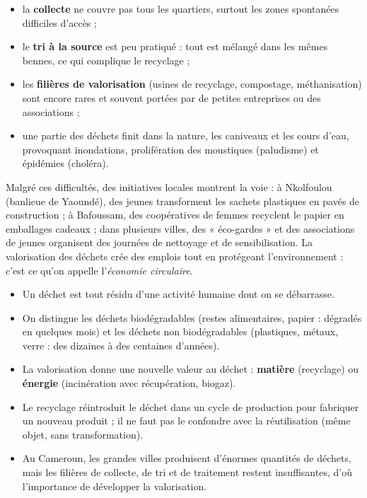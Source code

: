\documentclass[11pt]{article}
\newcommand{\cle}[1]{{\popxbold\color{popdark}#1}}
\begin{document}
\begin{itemize}
\item la \textbf{collecte} ne couvre pas tous les quartiers, surtout les zones spontanées difficiles d'accès ;
\item le \textbf{tri à la source} est peu pratiqué : tout est mélangé dans les mêmes bennes, ce qui complique le recyclage ;
\item les \textbf{filières de valorisation} (usines de recyclage, compostage, méthanisation) sont encore rares et souvent portées par de petites entreprises ou des associations ;
\item une partie des déchets finit dans la nature, les caniveaux et les cours d'eau, provoquant inondations, prolifération des moustiques (paludisme) et épidémies (choléra).
\end{itemize}

\begin{savaistu}
Malgré ces difficultés, des initiatives locales montrent la voie : à Nkolfoulou (banlieue de Yaoundé), des jeunes transforment les sachets plastiques en pavés de construction ; à Bafoussam, des coopératives de femmes recyclent le papier en emballages cadeaux ; dans plusieurs villes, des « éco-gardes » et des associations de jeunes organisent des journées de nettoyage et de sensibilisation. La valorisation des déchets crée des emplois tout en protégeant l'environnement : c'est ce qu'on appelle l'\emph{économie circulaire}.
\end{savaistu}

\begin{aretenir}
\begin{itemize}
\item Un \cle{déchet} est tout résidu d'une activité humaine dont on se débarrasse.
\item On distingue les déchets \cle{biodégradables} (restes alimentaires, papier : dégradés en quelques mois) et les déchets \cle{non biodégradables} (plastiques, métaux, verre : des dizaines à des centaines d'années).
\item La \cle{valorisation} donne une nouvelle valeur au déchet : \textbf{matière} (recyclage) ou \textbf{énergie} (incinération avec récupération, biogaz).
\item Le \cle{recyclage} réintroduit le déchet dans un cycle de production pour fabriquer un nouveau produit ; il ne faut pas le confondre avec la \cle{réutilisation} (même objet, sans transformation).
\item Au Cameroun, les grandes villes produisent d'énormes quantités de déchets, mais les filières de collecte, de tri et de traitement restent insuffisantes, d'où l'importance de développer la valorisation.
\end{itemize}
\end{aretenir}
\end{document}
